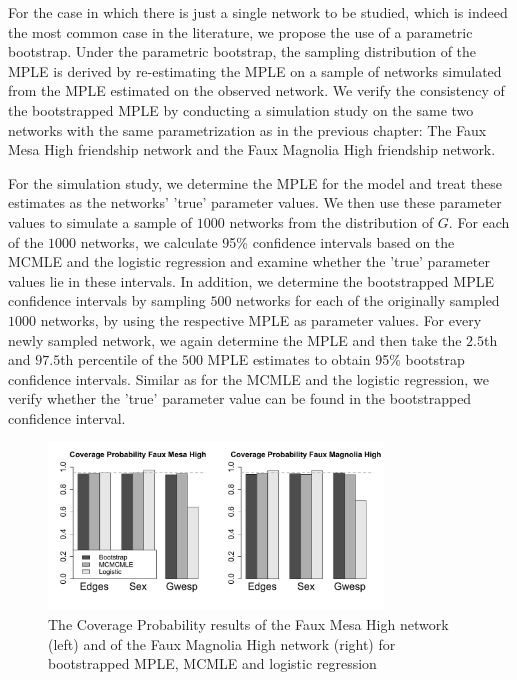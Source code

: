 \documentclass[10pt, conference, compsocconf]{IEEEtran}
\begin{document}
For the case in which there is just a single network to be studied, which is indeed the most common case in the literature, we propose the use of a parametric bootstrap. Under the parametric bootstrap, the sampling distribution of the MPLE is derived by re-estimating the MPLE on a sample of networks simulated from the MPLE estimated on the observed network. We verify the consistency of the bootstrapped MPLE by conducting a simulation study on the same two networks with the same parametrization as in the previous chapter: The Faux Mesa High friendship network and the Faux Magnolia High friendship network. 

For the simulation study, we determine the MPLE for the model and treat these estimates as the networks' 'true' parameter values. We then use these parameter values to simulate a sample of $1000$ networks from the distribution of $G$. For each of the $1000$ networks, we calculate 95\% confidence intervals based on the MCMLE and the logistic regression and examine whether the 'true' parameter values lie in these intervals. In addition, we determine the bootstrapped MPLE confidence intervals by sampling $500$ networks for each of the originally sampled $1000$ networks, by using the respective MPLE as parameter values. For every newly sampled network, we again determine the MPLE and then take the $2.5$th and $97.5$th percentile of the $500$ MPLE estimates to obtain  95\% bootstrap confidence intervals. Similar as for the MCMLE and the logistic regression, we verify whether the 'true' parameter value can be found in the bootstrapped confidence interval. 
\begin{figure}[!t]
\centering
\includegraphics[width=3.5in]{Coverage_Mesa_Magnolia_height05}
\caption{The Coverage Probability results of the Faux Mesa High network (left) and of the Faux Magnolia High network (right) for bootstrapped MPLE, MCMLE and logistic regression}
\label{coverage}
\end{figure}
\end{document}

